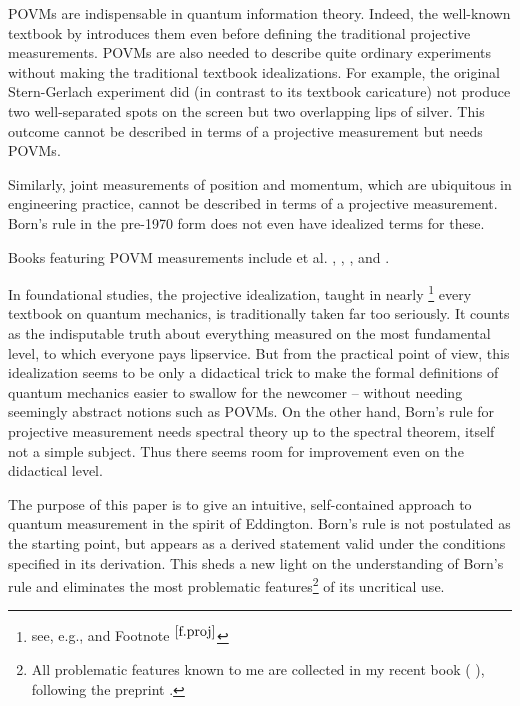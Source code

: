 \documentclass[12pt]{article}
\begin{document}
POVMs are indispensable in quantum information theory. Indeed, the
well-known textbook by  \cite{NieC} introduces
them even before defining the traditional projective measurements.
POVMs are also needed to describe quite ordinary experiments without
making the traditional textbook idealizations. For example, the original
Stern-Gerlach experiment did (in contrast to its textbook caricature)
not produce two well-separated spots on the screen but two overlapping
lips of silver. This outcome cannot be described in terms of a
projective measurement but needs POVMs.

Similarly, joint measurements of position and momentum, which are
ubiquitous in engineering practice, cannot be described in terms of a
projective measurement. Born's rule in the pre-1970 form does not even
have idealized terms for these.

Books featuring POVM measurements include
 et al. \cite{BusLM,BusGL,BusL2,BusLPY},
  \cite{deMuy2002},
 \cite{Hol1982,Hol2001,Hol2012},
 \cite{NieC} and  \cite{Peres}.

In foundational studies, the projective idealization, taught in
nearly \footnote{
see, e.g.,  \cite{Neu.7basic} and Footnote
${}^{\ref{f.proj}}$
} %
every textbook on quantum mechanics, is traditionally taken far too
seriously. It counts as the indisputable truth about everything measured
on the most fundamental level, to which everyone pays lipservice.
But from the practical point of view, this idealization seems to be only
a didactical trick to make the formal definitions of quantum mechanics
easier to swallow for the newcomer -- without needing seemingly abstract
notions such as POVMs. On the other hand, Born's rule for projective
measurement needs spectral theory up to the spectral theorem, itself not
a simple subject. Thus there seems room for improvement even on the
didactical level.

The purpose of this paper is to give an intuitive, self-contained
approach to quantum measurement in the spirit of Eddington. 
Born's rule is not postulated as the starting point, but appears as a
derived statement valid under the conditions specified in its
derivation. This sheds a new light on the understanding of Born's rule
and eliminates the most problematic features\footnote{
All problematic features known to me are collected in my recent book
( \cite[Section 14.3]{Neu.CQP}), following the preprint
 \cite[Section 3.3]{Neu.Ifound}.
} %
of its uncritical use.
\end{document}

